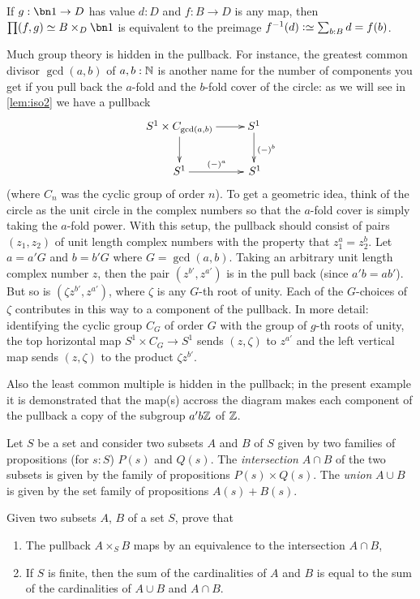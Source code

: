 \begin{example}
  If $g:\bn 1\to D$ has value $d:D$ and $f:B\to D$ is any map, then $\prod(f,g)\oldequiv B\times_D\bn 1$ is equivalent to the preimage $f^{-1}(d)\defequi\sum_{b:B}d=f(b)$.
\end{example}
\begin{example}
  \label{ex:pullbackandgcd}
  Much group theory is hidden in the pullback.  For instance, the greatest common divisor $\gcd(a,b)$ of $a,b:\mathbb{N}$ is another name for the number of components you get if you pull back the $a$-fold and the $b$-fold cover of the circle: as we will see in \cref{lem:iso2} we have a pullback
$$\xymatrix{S^1\times C_{\gcd(a,b)}\ar[d]\ar[r]& S^1\ar[d]^{(-)^b}\\
S^1\ar[r]^{(-)^a}&\,S^1}
$$
(where $C_n$ was the cyclic group of order $n$).
To get a geometric idea, think of the circle as the unit circle in the complex numbers so that the $a$-fold cover is simply taking the $a$-fold power.  With this setup, the pullback should consist of pairs $(z_1,z_2)$ of unit length complex numbers with the property that $z_1^a=z_2^b$.  Let $a=a'G$ and $b=b'G$ where $G=\gcd(a,b)$. Taking an arbitrary unit length complex number $z$, then the pair $(z^{b'},z^{a'})$ is in the pull back (since $a'b=ab'$).  But so is $(\zeta z^{b'},z^{a'})$, where $\zeta$ is any $G$-th root of unity.  Each of the $G$-choices of $\zeta$ contributes in this way to a component of the pullback.  In more detail: identifying the cyclic group $C_G$ of order $G$ with the group of $g$-th roots of unity, the top horizontal map $S^1\times C_G\to S^1$ sends $(z,\zeta)$ to $z^{a'}$ and the left vertical map sends $(z,\zeta)$ to the product $\zeta z^{b'}$.

Also the least common multiple is hidden in the pullback; in the present example it is demonstrated that the map(s) accross the diagram makes each component of the pullback a copy of the subgroup $a'b\mathbb{Z}$ of $\mathbb{Z}$.
\end{example}


\begin{definition}
  \label{def:intersectionand unionofsets}
  Let $S$ be a set and consider two subsets $A$ and $B$ of $S$ given by two families of propositions (for $s:S$) $P(s)$ and $Q(s)$.  The \emph{intersection} $A\cap B$ of the two subsets is given by the family of propositions $P(s)\times Q(s)$.  The \emph{union} $A\cup B$ is given by the set family of propositions $A(s)+B(s)$.
\end{definition}
\begin{xca}
  \label{xca:intersectionpullbackofsets}
  Given two subsets $A$, $B$ of a set $S$, prove that
  \begin{enumerate}
  \item The pullback $A\times_SB$ maps by an equivalence to the intersection $A\cap B$,
  \item\label{xca:cardinalityintersectionunion}
    If $S$ is finite, then the sum of the cardinalities of $A$ and $B$ is equal to the sum of the cardinalities of $A\cup B$ and $A\cap B$.
  \end{enumerate}
\end{xca}

